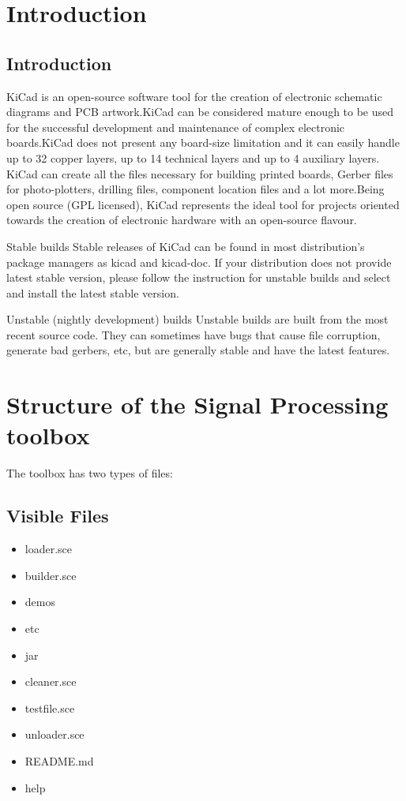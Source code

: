 \documentclass[12pt,a4paper]{  report}
\begin{document}
\tableofcontents

\chapter{\textbf{Introduction}}
\section{Introduction}
KiCad is an open-source software tool for the creation of electronic schematic diagrams and PCB artwork.KiCad can be considered mature enough to be used for the successful development and maintenance of complex electronic boards.KiCad does not present any board-size limitation and it can easily handle up to 32 copper layers, up to 14 technical layers and up to 4 auxiliary layers. KiCad can create all the files necessary for building printed boards, Gerber files for photo-plotters, drilling files, component location files and a lot more.Being open source (GPL licensed), KiCad represents the ideal tool for projects oriented towards the creation of electronic hardware with an open-source flavour.

Stable builds
Stable releases of KiCad can be found in most distribution’s package managers as kicad and kicad-doc. If your distribution does not provide latest stable version, please follow the instruction for unstable builds and select and install the latest stable version.

Unstable (nightly development) builds
Unstable builds are built from the most recent source code. They can
sometimes have bugs that cause file corruption, generate bad gerbers, etc, but are generally stable and have the latest  features.

\chapter{\textbf{Structure of the Signal Processing toolbox}}
The toolbox has two types of files:
\section{Visible Files}
\begin{itemize}
\item loader.sce
\item builder.sce
\item demos
\item etc
\item jar
\item cleaner.sce
\item testfile.sce
\item unloader.sce
\item README.md
\item help
\end{itemize}
\end{document}
